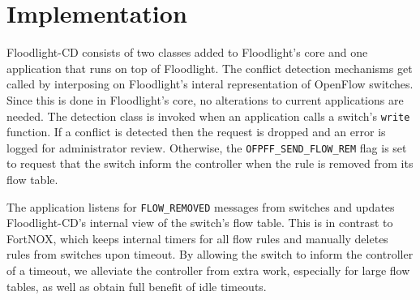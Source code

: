 \section{Implementation}
\label{sec:implementation}

Floodlight-CD consists of two classes added to Floodlight's core and one application that runs on top of Floodlight.
The conflict detection mechanisms get called by interposing on Floodlight's interal representation of OpenFlow switches.
Since this is done in Floodlight's core, no alterations to current applications are needed.
The detection class is invoked when an application calls a switch's \texttt{write} function.
If a conflict is detected then the request is dropped and an error is logged for administrator review.
Otherwise, the \texttt{OFPFF_SEND_FLOW_REM} flag is set to request that the switch inform the controller when the rule is removed from its flow table.

The application listens for \texttt{FLOW_REMOVED} messages from switches and updates Floodlight-CD's internal view of the switch's flow table.
This is in contrast to FortNOX, which keeps internal timers for all flow rules and manually deletes rules from switches upon timeout.
By allowing the switch to inform the controller of a timeout, we alleviate the controller from extra work, especially for large flow tables, as well as obtain full benefit of idle timeouts.

